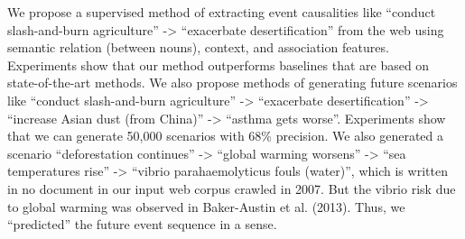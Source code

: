 We propose a supervised method of extracting event causalities like ``conduct slash-and-burn agriculture'' -> ``exacerbate desertification'' from the web using semantic relation (between nouns), context, and association features. Experiments show that our method outperforms baselines that are based on state-of-the-art methods. We also propose methods of generating future scenarios like ``conduct slash-and-burn agriculture'' -> ``exacerbate desertification'' -> ``increase Asian dust (from China)'' -> ``asthma gets worse''. Experiments show that we can generate 50,000 scenarios with 68\% precision. We also generated a scenario ``deforestation continues'' -> ``global warming worsens'' -> ``sea temperatures rise'' -> ``vibrio parahaemolyticus fouls (water)'', which is written in no document in our input web corpus crawled in 2007. But the vibrio risk due to global warming was observed in Baker-Austin et al. (2013). Thus, we ``predicted'' the future event sequence in a sense.
